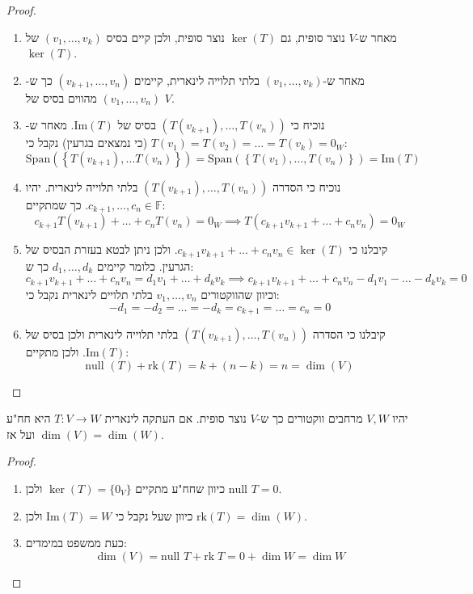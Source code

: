 \documentclass{tstextbook}
\begin{document}
\begin{proof}
  \begin{enumerate}
    \item מאחר ש-\(V\) נוצר סופית, גם \(\ker(T)\) נוצר סופית, ולכן קיים בסיס \(\left( v_{1},\dots,v_{k} \right)\) של \(\mathrm{\ker}(T)\). 


    \item מאחר ש-\(\left( v_{1},\dots,v_{k} \right)\) בלתי תלוייה לינארית, קיימים \(\left( v_{k+1},\dots,v_{n} \right)\) כך ש-\(\left( v_{1},\dots,v_{n} \right)\) מהווים בסיס של \(V\). 


    \item נוכיח כי \(\left( T(v_{k+1}),\dots ,T(v_{n}) \right)\) בסיס של \(\mathrm{\mathrm{Im}}(T)\). מאחר ש-\(T(v_{1})=T(v_{2})=\dots =T(v_{k})=0_{W}\) (כי נמצאים בגרעין) נקבל כי: 
$$\mathrm{Span}\left( \left\{  T(v_{k+1}),\dots T(v_{n})  \right\} \right)=\mathrm{Span}\left( \left\{  T(v_{1}),\dots,T(v_{n})  \right\} \right)=\mathrm{\mathrm{Im}}(T)$$


    \item נוכיח כי הסדרה \(\left( T(v_{k+1}),\dots,T(v_{n}) \right)\) בלתי תלוייה לינארית. יהיו \(c_{k+1},\dots,c_{n}\in \mathbb{F}\). כך שמתקיים: 
$$c_{k+1}T(v_{k+1})+\dots+c_{n}T(v_{n})=0_{W}\implies T\left( c_{k+1}v_{k+1}+\dots+c_{n}v_{n} \right)=0_{W}$$


    \item קיבלנו כי \(c_{k+1}v_{k+1}+\dots+c_{n}v_{n}\in \ker (T)\). ולכן ניתן לבטא בעזרת הבסיס של הגרעין. כלומר קיימים \(d_{1},\dots,d_{k}\) כך ש: 
$$c_{k+1}v_{k+1}+\dots+c_{n}v_{n}=d_{1}v_{1}+\dots+d_{k}v_{k}\implies c_{k+1}v_{k+1}+\dots+c_{n}v_{n}-d_{1}v_{1}-\dots-d_{k}v_{k}=0$$
וכיוון שהווקטורים \(v_{1},\dots,v_{n}\) בלתי תלויים לינארית נקבל כי:
$$-d_{1}=-d_{2}=\dots=-d_{k}=c_{k+1}=\dots=c_{n}=0$$


    \item קיבלנו כי הסדרה \(\left( T(v_{k+1}),\dots,T(v_{n}) \right)\) בלתי תלוייה לינארית ולכן בסיס של \(\mathrm{Im}(T)\). ולכן מתקיים: 
$$\text{null }(T)+\mathrm{rk}(T)=k+(n-k)=n=\dim(V)$$


  \end{enumerate}
\end{proof}
\begin{corollary}
יהיו \(V,W\) מרחבים ווקטורים כך ש-\(V\) נוצר סופית. אם העתקה לינארית \(T:V\to W\) היא חח"ע ועל אז \(\dim(V)=\dim(W)\).

\end{corollary}
\begin{proof}
  \begin{enumerate}
    \item כיוון שחח"ע מתקיים \(\ker(T)=\{ 0_{V} \}\) ולכן \(\text{null }T=0\). 


    \item כיוון שעל נקבל כי \(\mathrm{Im}(T)=W\) ולכן \(\mathrm{rk}(T)=\dim (W)\). 


    \item כעת ממשפט במימדים: 
$$\dim(V)=\text{null }T+\mathrm{rk\;}T=0+\dim W=\dim W$$


  \end{enumerate}
\end{proof}
\end{document}
